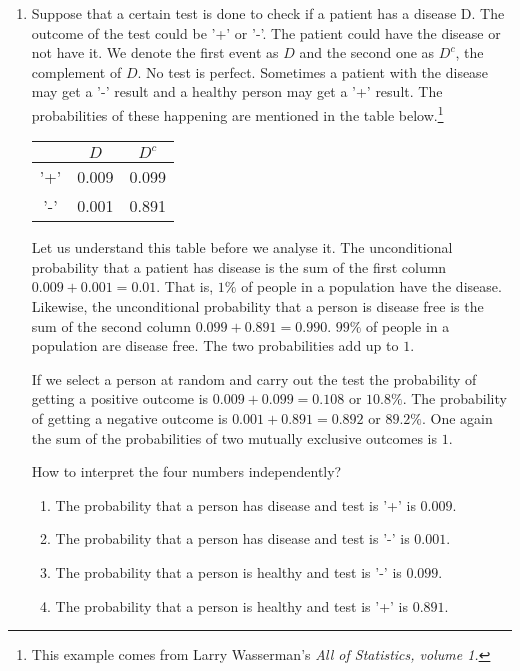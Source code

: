\documentclass{article}
\begin{document}
\begin{enumerate}
\item Suppose that a certain test is done to check if a patient has a 
disease D. The outcome of the test could be '+' or '-'. The patient could
have the disease or not have it. We denote the first event as $D$ and the
second one as $D^c$, the complement of $D$. No test is perfect. Sometimes 
a patient with the disease may get a '-' result and a healthy person may
get a '+' result. The probabilities of these happening are mentioned in 
the table below.\footnote{This example comes from Larry Wasserman's \emph{
All of Statistics, volume 1.}}
\begin{center}
\begin{tabular}{c | c c}
 & $D$ & $D^c$ \\
\hline
'+' & 0.009 & 0.099 \\
'-' & 0.001 & 0.891
\end{tabular}
\end{center}
Let us understand this table before we analyse it. The unconditional 
probability that a patient has disease is the sum of the first column $
0.009 + 0.001 = 0.01$. That is, $1 \%$ of people in a population have the
disease. Likewise, the unconditional probability that a person is disease
free is the sum of the second column $0.099 + 0.891 = 0.990$. $99\%$ of 
people in a population are disease free. The two probabilities add up to 
$1$.

If we select a person at random and carry out the test the probability of
getting a positive outcome is $0.009 + 0.099 = 0.108$ or $10.8\%$. The 
probability of getting a negative outcome is $0.001 + 0.891 = 0.892$ or
$89.2\%$. One again the sum of the probabilities of two mutually exclusive
outcomes is $1$.

How to interpret the four numbers independently?
\begin{enumerate}
\item The probability that a person has disease and test is '+' is $0.009$.
\item The probability that a person has disease and test is '-' is $0.001$.
\item The probability that a person is healthy and test is '-' is $0.099$.
\item The probability that a person is healthy and test is '+' is $0.891$.
\end{enumerate}


\end{enumerate}
\end{document}
